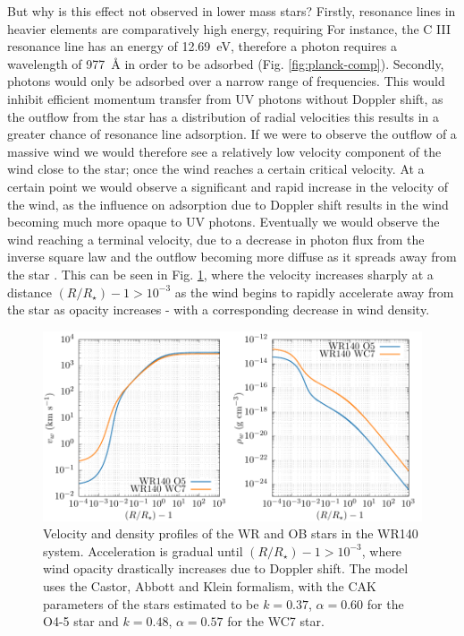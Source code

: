 But why is this effect not observed in lower mass stars?
Firstly, resonance lines in heavier elements are comparatively high energy, requiring 
For instance, the C III resonance line has an energy of \SI{12.69}{\electronvolt}, therefore a photon requires a wavelength of \SI{977}{\angstrom} in order to be adsorbed (Fig. {\ref{fig:planck-comp}}).
Secondly, photons would only be adsorbed over a narrow range of frequencies.
This would inhibit efficient momentum transfer from UV photons without Doppler shift, as the outflow from the star has a distribution of radial velocities this results in a greater chance of resonance line adsorption.
If we were to observe the outflow of a massive wind we would therefore see a relatively low velocity component of the wind close to the star; once the wind reaches a certain critical velocity.
At a certain point we would observe a significant and rapid increase in the velocity of the wind, as the influence on adsorption due to Doppler shift results in the wind becoming much more opaque to UV photons.
Eventually we would observe the wind reaching a terminal velocity, due to a decrease in photon flux from the inverse square law and the outflow becoming more diffuse as it spreads away from the star \parencite[Ch.~10]{macielHydrodynamicsStellarWinds2014}.
This can be seen in Fig. \ref{fig:cak-vel}, where the velocity increases sharply at a distance $(R/R_\star) - 1 > 10^{-3}$ as the wind begins to rapidly accelerate away from the star as opacity increases - with a corresponding decrease in wind density.

\begin{figure}[h]
  \centering
  \includegraphics[]{assets/cak/vel.pdf}
  \caption[Radiative line driving velocity and density profile]{Velocity and density profiles of the WR and OB stars in the WR140 system. Acceleration is gradual until $(R/R_\star) - 1 > 10^{-3}$, where wind opacity drastically increases due to Doppler shift. The model uses the Castor, Abbott and Klein formalism, with the CAK parameters of the stars estimated to be $k = 0.37$, $\alpha = 0.60$ for the O4-5 star and $k = 0.48$, $\alpha = 0.57$ for the WC7 star.}
  \label{fig:cak-vel}
\end{figure}

